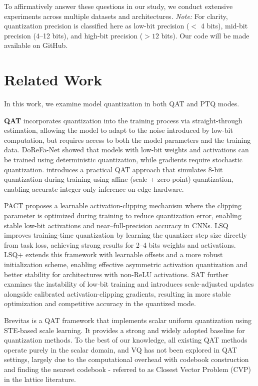\documentclass{article}
\theoremstyle{definition}
\theoremstyle{remark}
\begin{document}
To affirmatively answer these questions in our study, we conduct extensive experiments across multiple datasets and architectures. \textit{Note:} For clarity, quantization precision is classified here as low-bit precision ($<$ 4 bits), mid-bit precision (4–12 bits), and high-bit precision ($>12$ bits). Our code will be made available on GitHub.

\section{Related Work}
In this work, we examine model quantization in both QAT and PTQ modes.

\textbf{QAT} incorporates quantization into the training process via straight-through estimation, allowing the model to adapt to the noise introduced by low-bit computation, but requires access to both the model parameters and the training data.
DoReFa-Net \cite{dorfa} showed that models with low-bit weights and activations can be trained using deterministic quantization, while gradients require stochastic quantization. \cite{jacob} introduces a practical QAT approach that simulates 8-bit quantization during training using affine (scale + zero-point) quantization, enabling accurate integer-only inference on edge hardware.

PACT \cite{pact} proposes a learnable activation-clipping mechanism where the clipping parameter is optimized during training to reduce quantization error, enabling stable low-bit activations and near–full-precision accuracy in CNNs. LSQ \cite{lsq} improves training-time quantization by learning the quantizer step size directly from task loss, achieving strong results for 2–4 bits weights and activations. LSQ+ \cite{lsq+} extends this framework with learnable offsets and a more robust initialization scheme, enabling effective asymmetric activation quantization and better stability for architectures with non-ReLU activations. SAT \cite{sat} further examines the instability of low-bit training and introduces scale-adjusted updates alongside calibrated activation-clipping gradients, resulting in more stable optimization and competitive accuracy in the quantized mode.

Brevitas \cite{brevitas} is a QAT framework that implements scalar uniform quantization using STE-based scale learning. It provides a strong and widely adopted baseline for quantization methods. To the best of our knowledge, all existing QAT methods operate purely in the scalar domain, and VQ has not been explored in QAT settings, largely due to the computational overhead with codebook construction and finding the nearest codebook - referred to as Closest Vector Problem (CVP) in the lattice literature.
\end{document}

